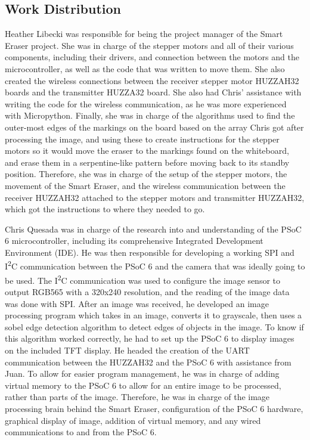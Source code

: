 \subsection{Work Distribution}
\setlength{\parindent}{2.5ex} Heather Libecki was responsible for being the project manager of the Smart Eraser project. She was in charge of the stepper motors and all of their various components, including their drivers, and connection between the motors and the microcontroller, as well as the code that was written to move them. She also created the wireless connections between the receiver stepper motor HUZZAH32 boards and the transmitter HUZZA32 board. She also had Chris' assistance with writing the code for the wireless communication, as he was more experienced with Micropython. Finally, she was in charge of the algorithms used to find the outer-most edges of the markings on the board based on the array Chris got after processing the image, and using these to create instructions for the stepper motors so it would move the eraser to the markings found on the whiteboard, and erase them in a serpentine-like pattern before moving back to its standby position. Therefore, she was in charge of the setup of the stepper motors, the movement of the Smart Eraser, and the wireless communication between the receiver HUZZAH32 attached to the stepper motors and transmitter HUZZAH32, which got the instructions to where they needed to go. \par
\setlength{\parindent}{2.5ex} Chris Quesada was in charge of the research into and understanding of the PSoC 6 microcontroller, including its comprehensive Integrated Development Environment (IDE). He was then responsible for developing a working SPI and I\textsuperscript{2}C communication between the PSoC 6 and the camera that was ideally going to be used. The I\textsuperscript{2}C communication was used to configure the image sensor to output RGB565 with a 320x240 resolution, and the reading of the image data was done with SPI. After an image was received, he developed an image processing program which takes in an image, converts it to grayscale, then uses a sobel edge detection algorithm to detect edges of objects in the image. To know if this algorithm worked correctly, he had to set up the PSoC 6 to display images on the included TFT display. He headed the creation of the UART communication between the HUZZAH32 and the PSoC 6 with assistance from Juan. To allow for easier program management, he was in charge of adding virtual memory to the PSoC 6 to allow for an entire image to be processed, rather than parts of the image. Therefore, he was in charge of the image processing brain behind the Smart Eraser, configuration of the PSoC 6 hardware, graphical display of image, addition of virtual memory, and any wired communications to and from the PSoC 6.
